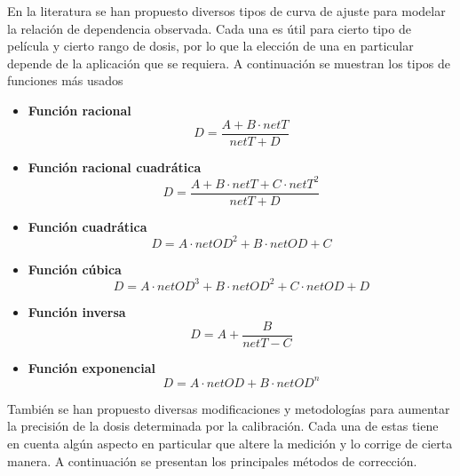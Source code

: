 En la literatura se han propuesto diversos tipos de curva de ajuste para modelar la relación de dependencia observada. Cada una es útil para cierto tipo de película y cierto rango de dosis, por lo que la elección de una en particular depende de la aplicación que se requiera. A continuación se muestran los tipos de funciones más usados\cite{Devic2016} \\

\begin{itemize}
\item\textbf{Función racional}\\
\begin{equation}
	D=\frac{A+B\cdot netT}{netT+D}
\end{equation}
\item\textbf{Función racional cuadrática}\\
\begin{equation}
D=\frac{A+B\cdot netT+C\cdot netT^2}{netT+D}
\end{equation}
\item\textbf{Función cuadrática}\\
\begin{equation}
D=A\cdot netOD^2+B\cdot netOD+C
\end{equation}
\item\textbf{Función cúbica}\\
\begin{equation}
D=A\cdot netOD^3+B\cdot netOD^2+C\cdot netOD +D 
\end{equation}

\item\textbf{Función inversa}\\
\begin{equation}
D=A+\frac{B}{netT-C}
\end{equation}

\item\textbf{Función exponencial}\\
\begin{equation}
D=A\cdot netOD+B\cdot netOD^n
\end{equation}
\end{itemize}

También se han propuesto diversas modificaciones y metodologías para aumentar la precisión de la dosis determinada por la calibración. Cada una de estas tiene en cuenta algún aspecto en particular que altere la medición y lo corrige de cierta manera. A continuación se presentan los principales métodos de corrección.\\



